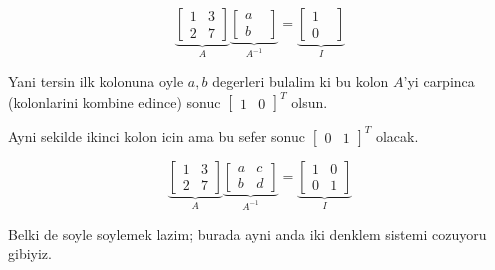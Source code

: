 \documentclass[12pt,fleqn]{article}\usepackage{../common}
\begin{document}
$$ 
\underbrace{
\left[\begin{array}{rrr}
1 & 3 \\
2 & 7
\end{array}\right]
}_{A}
\underbrace{
\left[\begin{array}{rrr}
a &  \\
b & 
\end{array}\right]
}_{A^{-1}}
=
\underbrace{
\left[\begin{array}{rrr}
1 &  \\
0 & 
\end{array}\right]
}_{I}
 $$

Yani tersin ilk kolonuna oyle $a,b$ degerleri bulalim ki bu kolon $A$'yi
carpinca (kolonlarini kombine edince) sonuc $\left[\begin{array}{rr}1 &
    0\end{array}\right]^T$ olsun. 

Ayni sekilde ikinci kolon icin ama bu sefer sonuc $\left[\begin{array}{rr}0 &
 1\end{array}\right]^T$ olacak. 


$$ 
\underbrace{
\left[\begin{array}{rrr}
1 & 3 \\
2 & 7
\end{array}\right]
}_{A}
\underbrace{
\left[\begin{array}{rrr}
a & c \\
b & d
\end{array}\right]
}_{A^{-1}}
=
\underbrace{
\left[\begin{array}{rrr}
1 & 0 \\
0 & 1
\end{array}\right]
}_{I}
 $$

Belki de soyle soylemek lazim; burada ayni anda iki denklem sistemi
cozuyoru gibiyiz. 
\end{document}

